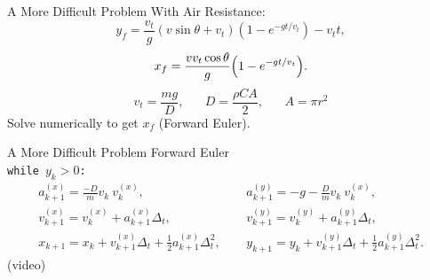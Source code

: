\documentclass{beamer}
\begin{document}
\begin{frame}{A More Difficult Problem}
\vspace{-20pt}With Air Resistance:
\begin{equation}
y_f=\frac{v_t}{g}(v\sin\theta+v_t)\left(1-e^{-gt/v_t}\right)-v_tt,
\end{equation}
\begin{equation}
x_f=\frac{vv_t\cos\theta}{g}\qty(1-e^{-gt/v_t}).
\end{equation}
\begin{equation}
v_t=\frac{mg}{D},\hspace{20pt}D=\frac{\rho C A}{2},\hspace{20pt}A=\pi r^2
\end{equation}
\hspace{30pt}Solve numerically to get $x_f$ (Forward Euler).
\end{frame}

\begin{frame}{A More Difficult Problem}
\vspace{-30pt}Forward Euler\\
\texttt{while $y_k>0$:}
\begin{align*}
a^{(x)}_{k+1} = \frac{-D}{m}v_k\ v_k^{(x)},&\hspace{15pt}a^{(y)}_{k+1} = -g-\frac{D}{m}v_k\ v_k^{(x)},\\[15pt]
v^{(x)}_{k+1} =v^{(x)}_{k}+ a^{(x)}_{k+1}\Delta_t,&\hspace{15pt}v^{(y)}_{k+1} =v^{(y)}_{k}+ a^{(y)}_{k+1}\Delta_t,\\[15pt]
x_{k+1} =x_k+ v_{k+1}^{(x)}\Delta_t + \frac{1}{2}a_{k+1}^{(x)} \Delta_t^2,&\hspace{15pt}y_{k+1} =y_k+ v_{k+1}^{(y)}\Delta_t + \frac{1}{2}a_{k+1}^{(y)} \Delta_t^2.
\end{align*}
(video)
\end{frame}
\end{document}
